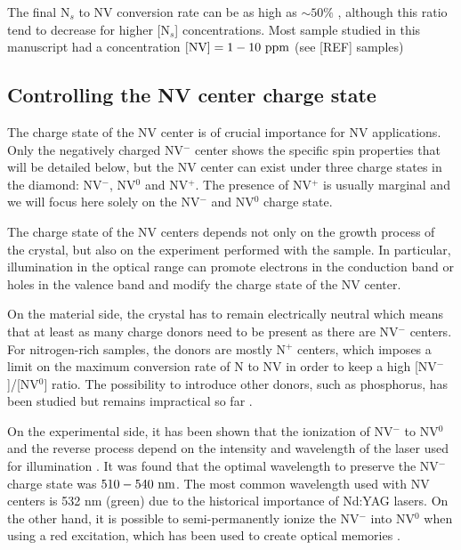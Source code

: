 \documentclass[a4paper,11pt]{report}
\begin{document}
The final N$_s$ to NV conversion rate can be as high as $\sim 50 \%$ \citep{grezes2015storage, hartland2014study}, although this ratio tend to decrease for higher [N$_s$] concentrations. Most sample studied in this manuscript had a concentration $[\rm NV]= 1-10\ \rm ppm$ (see [REF] samples)

\subsection{Controlling the NV center charge state}

The charge state of the NV center is of crucial importance for NV applications. Only the negatively charged NV$^-$ center shows the specific spin properties that will be detailed below, but the NV center can exist under three charge states in the diamond: NV$^-$, NV$^0$ and NV$^+$. The presence of NV$^+$ is usually marginal \citep{hauf2014addressing, pfender2017protecting} and we will focus here solely on the NV$^-$ and NV$^0$ charge state.

The charge state of the NV centers depends not only on the growth process of the crystal, but also on the experiment performed with the sample. In particular, illumination in the optical range can promote electrons in the conduction band or holes in the valence band and modify the charge state of the NV center.

On the material side, the crystal has to remain electrically neutral which means that at least as many charge donors need to be present as there are NV$^-$ centers. For nitrogen-rich samples, the donors are mostly N$^+$ centers, which imposes a limit on the maximum conversion rate of N to NV in order to keep a high [NV$^-$]/[NV$^0$] ratio. The possibility to introduce other donors, such as phosphorus, has been studied \citep{doi2016pure} but remains impractical so far \citep{barry2020sensitivity}.

On the experimental side, it has been shown that the ionization of NV$^-$ to NV$^0$ and the reverse process depend on the intensity and wavelength of the laser used for illumination \citep{aslam2013photo}. It was found that the optimal wavelength to preserve the NV$^-$ charge state was  $510-540\ \rm nm$. The most common wavelength used with NV centers is 532 nm (green) due to the historical importance of Nd:YAG lasers. On the other hand, it is possible to semi-permanently ionize the NV$^-$ into NV$^0$ when using a red excitation, which has been used to create optical memories \citep{dhomkar2016long}.
\end{document}

